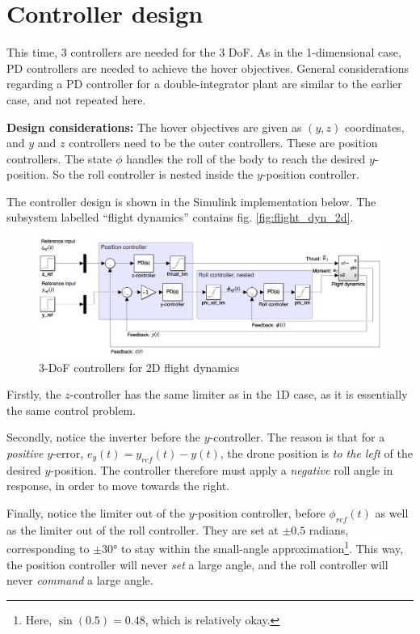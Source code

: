 \documentclass[a4paper]{report}
\begin{document}
\section{Controller design}
This time, 3 controllers are needed for the 3 \gls{DoF}.
As in the 1-dimensional case, PD controllers are needed to achieve the hover objectives.
General considerations regarding a PD controller for a double-integrator plant are similar to the earlier case, and not repeated here.

\textbf{Design considerations:} The hover objectives are given as $(y,z)$ coordinates, and $y$ and $z$ controllers need to be the outer controllers. 
These are position controllers.
The state $\phi$ handles the roll of the body to reach the desired $y$-position.
So the roll controller is nested inside the $y$-position controller.

The controller design is shown in the Simulink implementation below. 
The subsystem labelled ``flight dynamics'' contains fig. \ref{fig:flight_dyn_2d}.

\begin{figure}[H]
\centering
\includegraphics[width=15.5cm]{img/flight_controller_2d.png}
\caption{3-\gls{DoF} controllers for 2D flight dynamics\label{fig:flight_controller_2d}}
\end{figure}

Firstly, the $z$-controller has the same limiter as in the 1D case, as it is essentially the same control problem.

Secondly, notice the inverter before the $y$-controller.
The reason is that for a \textit{positive} $y$-error, $e_y(t)=y_{ref}(t)-y(t)$, the drone position is \textit{to the left} of the desired $y$-position.
The controller therefore must apply a \textit{negative} roll angle in response, in order to move towards the right.

Finally, notice the limiter out of the $y$-position controller, before $\phi_{ref}(t)$ as well as
the limiter out of the roll controller.
They are set at $\pm 0.5$ radians, corresponding to $\pm 30$° to stay within the small-angle approximation\footnote{Here, $\sin(0.5)=0.48$, which is relatively okay.}. 
This way, the position controller will never \textit{set} a large angle, and the roll controller will never \textit{command} a large angle.
\end{document}
